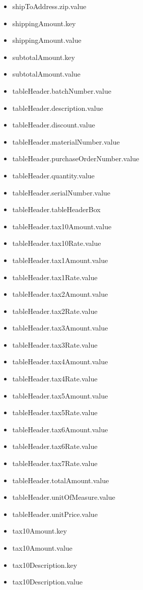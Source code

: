 \begin{multicols}{2}
\begin{itemize}
\item[] shipToAddress.zip.value
\item[] shippingAmount.key
\item[] shippingAmount.value
\item[] subtotalAmount.key
\item[] subtotalAmount.value
\item[] tableHeader.batchNumber.value
\item[] tableHeader.description.value
\item[] tableHeader.discount.value
\item[] tableHeader.materialNumber.value
\item[] tableHeader.purchaseOrderNumber.value
\item[] tableHeader.quantity.value
\item[] tableHeader.serialNumber.value
\item[] tableHeader.tableHeaderBox
\item[] tableHeader.tax10Amount.value
\item[] tableHeader.tax10Rate.value
\item[] tableHeader.tax1Amount.value
\item[] tableHeader.tax1Rate.value
\item[] tableHeader.tax2Amount.value
\item[] tableHeader.tax2Rate.value
\item[] tableHeader.tax3Amount.value
\item[] tableHeader.tax3Rate.value
\item[] tableHeader.tax4Amount.value
\item[] tableHeader.tax4Rate.value
\item[] tableHeader.tax5Amount.value
\item[] tableHeader.tax5Rate.value
\item[] tableHeader.tax6Amount.value
\item[] tableHeader.tax6Rate.value
\item[] tableHeader.tax7Rate.value
\item[] tableHeader.totalAmount.value
\item[] tableHeader.unitOfMeasure.value
\item[] tableHeader.unitPrice.value
\item[] tax10Amount.key
\item[] tax10Amount.value
\item[] tax10Description.key
\item[] tax10Description.value

\end{itemize}
\end{multicols}
